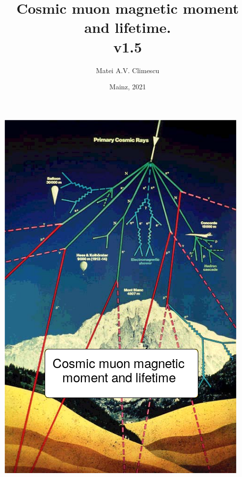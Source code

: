 \documentclass[12pt]{report}
\title{Cosmic muon magnetic moment and lifetime.\\
	\large v1.5}
\author{Matei A.V. Climescu}
\date{Mainz, 2021}
\newenvironment{changemargin}[2]{%
\begin{list}{}{%
\setlength{\topsep}{0pt}%
\setlength{\leftmargin}{#1}%
\setlength{\rightmargin}{#2}%
\setlength{\listparindent}{\parindent}%
\setlength{\itemindent}{\parindent}%
\setlength{\parsep}{\parskip}%
}%
\item[]}{\end{list}}
\begin{document}
\maketitle
\begin{titlepage}
\begin{changemargin}{-0cm}{-0cm}
\includegraphics[width=\linewidth]{./fig/cover.png}
\end{changemargin}
\end{titlepage}


    
    
    
    
    
    
    
    




\end{document}

